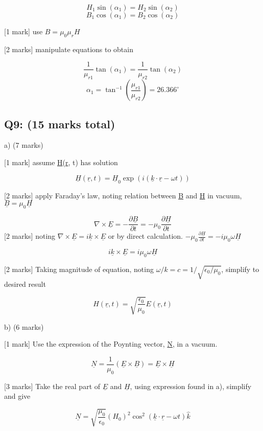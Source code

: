 \documentclass[a4paper,11pt]{article}
\begin{document}
\[ H_1 \sin(\alpha_1) = H_2 \sin(\alpha_2) \]
\[ B_1 \cos(\alpha_1) = B_2 \cos(\alpha_2) \]

[1 mark] use \( B = \mu_0 \mu_r H \)

[2 marks] manipulate equations to obtain 

\[ \frac{1}{\mu_{r1}} \tan(\alpha_1) = \frac{1}{\mu_{r2}} \tan(\alpha_2) \]
\[ \alpha_1 = \tan^{-1}\left ( \frac{\mu_{r1}}{\mu_{r2}} \right ) = 26.366^{\circ} \]

\subsection*{Q9: (15 marks total)}

a) (7 marks)

[1 mark] assume \underline{H}(\underline{r}, t) has solution

\[ \underline{H}(\underline{r}, t) = \underline{H}_0 \exp (i(\underline{k} \cdot \underline{r} - \omega t)) \]

[2 marks] apply Faraday's law, noting relation between \underline{B} and \underline{H} in vacuum, \( \underline{B} = \mu_0 \underline{H} \)

\[ \nabla \times \underline{E} = - \frac{\partial \underline{B}}{\partial t} = - \mu_0 \frac{\partial \underline{H}}{\partial t}  \]
[2 marks] noting \( \nabla \times \underline{E} = i \underline{k} \times \underline{E} \) or by direct calculation. \( - \mu_0 \frac{\partial \underline{H}}{\partial t} = - i \mu_0 \omega \underline{H} \)

\[ i \underline{k} \times \underline{E} = i \mu_0 \omega \underline{H} \]

[2 marks] Taking magnitude of equation, noting \( \omega / k = c = 1 / \sqrt{\epsilon_0 / \mu_0} \), simplify to desired result 

\[ H(\underline{r}, t) = \sqrt{\frac{\epsilon_{0}}{\mu_{0}}} E(\underline{r}, t) \]

b) (6 marks)

[1 mark] Use the expression of the Poynting vector, \underline{N}, in a vacuum. 

\[ \underline{N} = \frac{1}{\mu_0} ( \underline{E} \times \underline{B} ) = \underline{E} \times \underline{H} \]

[3 marks] Take the real part of \( \underline{E} \) and \( \underline{H} \), using expression found in a), simplify and give 

\[ \underline{N} = \sqrt{\frac{\mu_0}{\epsilon_0}} (H_0)^2 \cos^2(\underline{k} \cdot \underline{r} - \omega t) \hat{k} \]
\end{document}
